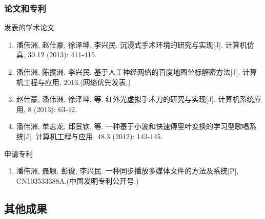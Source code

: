 \documentclass[xcolor=svgnames,serif,table]{beamer}
\begin{document}
\begin{frame}
  \frametitle{论文和专利}
  \begin{block}{发表的学术论文}
    \scriptsize\sffamily
    \begin{enumerate}
  \item {\normalfont 潘伟洲}, 赵仕豪, 徐泽坤, 李兴民. 沉浸式手术环境的研究与实现[J]. 计算机仿真,
  30.12 (2013): 411-415.\pause
  \item {\normalfont 潘伟洲}, 陈振洲, 李兴民. 基于人工神经网络的百度地图坐标解密方法[J].
    计算机工程与应用, 2013.(网络优先发表.)\pause
  \item 赵仕豪, {\normalfont 潘伟洲}, 徐泽坤, 等. 红外光虚拟手术刀的研究与实现[J]. 计算机系统应用,
    8 (2013): 63-42.\pause
  \item {\normalfont 潘伟洲}, 单志龙, 邱景钦, 等. 一种基于小波和快速傅里叶变换的学习型歌唱系统[J].
    计算机工程与应用, 48.3 (2012): 143-145.
  \end{enumerate}
\end{block}
\pause
\begin{block}{申请专利}
  \scriptsize\sffamily
  \begin{enumerate}
  \item {\normalfont 潘伟洲}, 聂颖, 彭俊, 李兴民. 一种同步播放多媒体文件的方法及系统[P], CN103533388A.(中国发明专利公开号.)
  \end{enumerate}
\end{block}
\end{frame}

\subsection{其他成果}
\end{document}
